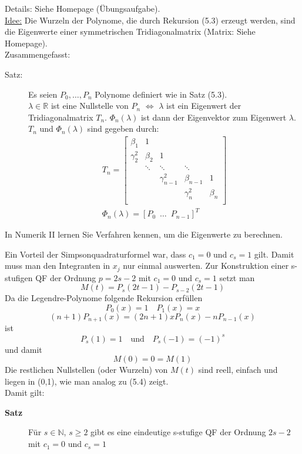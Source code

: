 \begin{nothing}
Details: Siehe Homepage (Übungsaufgabe). \\
\underline{Idee:} Die Wurzeln der Polynome, die durch Rekursion (5.3) erzeugt werden, sind die Eigenwerte einer symmetrischen Tridiagonalmatrix (Matrix: Siehe Homepage).\\
Zusammengefasst: \\ 
\begin{description}
  \item[Satz:] Es seien $P_0, \dots, P_n$ Polynome definiert wie in Satz (5.3). \\
  $\lambda \in \mathbb{R}$ ist eine Nullstelle von $P_n$ $\Leftrightarrow$ $\lambda$ ist ein Eigenwert der Tridiagonalmatrix $T_n$. $\Phi_n(\lambda)$ ist dann der Eigenvektor zum Eigenwert $\lambda$. \\
  $T_n$ und $\Phi_n(\lambda)$ sind gegeben durch:
  \begin{align*}
    &T_n = 
    \left[ \begin{array}{rrrrr}
	\beta_1 & 1 &&&\\
	\gamma_2^2 & \beta_2 & 1 &&\\
	& \ddots & \ddots & \ddots & \\
	&&\gamma_{n-1}^2 & \beta_{n-1}&1 \\
	&&& \gamma_n^2 & \beta_n \\
	\end{array}\right] &\\
	&\Phi_n(\lambda) = \left[P_0 \enspace \dots \enspace P_{n-1} \right]^T
  \end{align*}
\end{description}
In Numerik II lernen Sie Verfahren kennen, um die Eigenwerte zu berechnen.
\end{nothing}

\begin{nothing}
Ein Vorteil der Simpsonquadraturformel war, dass $c_1=0$ und $c_s=1$ gilt. Damit muss man den Integranten in $x_j$ nur einmal auswerten. Zur Konstruktion einer s-stufigen QF der Ordnung $p=2s-2$ mit $c_1=0$ und $c_s=1$ setzt man 
$$M(t) = P_s(2t-1) - P_{s-2}(2t-1)$$
Da die Legendre-Polynome folgende Rekursion erfüllen
$$P_0(x)=1 \quad P_1(x) = x $$
$$ (n+1)P_{n+1}(x) = (2n+1)xP_n(x) - nP_{n-1}(x)$$
ist 
$$ P_s(1) = 1 \quad \text{und} \quad P_s(-1) = (-1)^s$$
und damit 
$$M(0) = 0 = M(1)$$
Die restlichen Nullstellen (oder Wurzeln) von $M(t)$ sind reell, einfach und liegen in (0,1), wie man analog zu (5.4) zeigt.\\
Damit gilt:
\begin{description}
  \item[\textbf{Satz}]
    Für $s \in \mathbb{N}$, $s \geq 2$ gibt es eine eindeutige s-stufige QF der Ordnung $2s-2$ mit $c_1=0$ und $c_s=1$
\end{description}
\end{nothing}